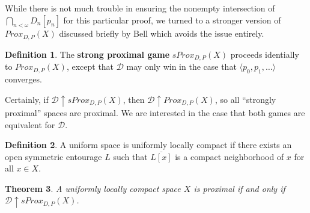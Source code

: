 \documentclass{amsart}
\newtheorem{thm}{Theorem}[section]
\theoremstyle{definition}
\newtheorem{defn}[thm]{Definition}
\theoremstyle{remark}
\newcommand{\<}{\langle}
\renewcommand{\>}{\rangle}
\newcommand{\cl}[1]{\overline{#1}}
\newcommand{\proxgame}[1]{Prox_{D,P}(#1)}
\newcommand{\sproxgame}[1]{sProx_{D,P}(#1)}
\newcommand{\pl}[1]{\mathscr{#1}}
\newcommand{\win}{\uparrow}
\begin{document}
While there is not much trouble in ensuring the nonempty intersection of\\ $\bigcap_{n<\omega} D_n[p_n]$ for this particular proof, we turned to a stronger version of $\proxgame{X}$ discussed briefly by Bell which avoids the issue entirely.

\begin{defn}
  The \textbf{strong proximal game} $\sproxgame{X}$ proceeds identially to $\proxgame{X}$, except that $\pl D$ may only win in the case that $\<p_0,p_1,\dots\>$ converges.
\end{defn}

Certainly, if $\pl D\win \sproxgame{X}$, then $\pl D\win \proxgame{X}$, so all ``strongly proximal'' spaces are proximal. We are interested in the case that both games are equivalent for $\pl D$.

\begin{defn}
  A uniform space is uniformly locally compact if there exists an open symmetric entourage $L$ such that $\cl{L[x]}$ is a compact neighborhood of $x$ for all $x\in X$.
\end{defn}

\begin{thm}
  A uniformly locally compact space $X$ is proximal if and only if $\pl D\win \sproxgame{X}$.
\end{thm}
\end{document}
